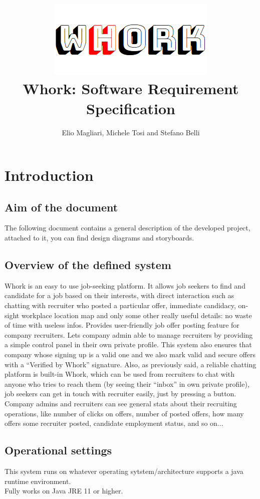 \documentclass[12pt, a4paper]{article}
\title{\includegraphics{logo.png}\\Whork: Software Requirement Specification}
\author{Elio Magliari, Michele Tosi and Stefano Belli}
\date{}
\newcommand{\dquote}[1]{``#1''}
\begin{document}
\maketitle
\section{Introduction}
\subsection{Aim of the document}
The following document contains a general description of the developed project, attached to it, you can find
design diagrams and storyboards.
\subsection{Overview of the defined system}
Whork is an easy to use job-seeking platform. It allows job seekers to find and candidate for a job based on their interests, with direct interaction such as
chatting with recruiter who posted a particular offer, immediate candidacy, on-sight workplace location map and only some other really useful details: no waste of time with useless infos.
Provides user-friendly job offer posting feature for company recruiters. Lets company admin able to manage recruiters by providing
a simple control panel in their own private profile. This system also ensures that company whose signing up is a valid one and we also mark
valid and secure offers with a \dquote{Verified by Whork} signature. Also, as previously said, a reliable chatting platform is built-in Whork, which can be used from recruiters to chat with
anyone who tries to reach them (by seeing their \dquote{inbox} in own private profile), job seekers can get in touch with recruiter easily, just by pressing a button. Company admins and recruiters
can see general stats about their recruiting operations, like number of clicks on offers, number of posted offers, how many offers some recruiter posted, candidate employment status, and so on...
\subsection{Operational settings}
This system runs on whatever operating sytstem/architecture supports a java runtime environment.\\
 Fully works on Java JRE 11 or higher.
\end{document}
